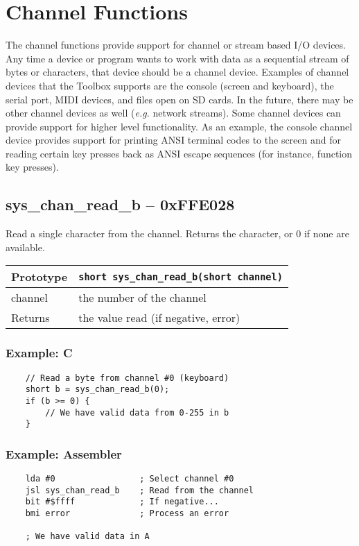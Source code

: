 \section{Channel Functions}
The channel functions provide support for channel or stream based I/O devices.
Any time a device or program wants to work with data as a sequential stream of bytes or characters,
that device should be a channel device.
Examples of channel devices that the Toolbox supports are the console (screen and keyboard), the serial port,
MIDI devices, and files open on SD cards.
In the future, there may be other channel devices as well ({\it e.g.} network streams).
Some channel devices can provide support for higher level functionality.
As an example, the console channel device provides support for printing ANSI terminal codes to the screen
and for reading certain key presses back as ANSI escape sequences (for instance, function key presses).

\subsection*{sys\_chan\_read\_b -- 0xFFE028}
Read a single character from the channel. Returns the character, or 0 if none are available.

\bigskip

\begin{tabular}{|l||l|} \hline
Prototype & \lstinline!short sys_chan_read_b(short channel)! \\ \hline
channel & the number of the channel \\ \hline
Returns & the value read (if negative, error) \\ \hline
\end{tabular}

\subsubsection*{Example: C}
\begin{lstlisting}
    // Read a byte from channel #0 (keyboard)
    short b = sys_chan_read_b(0);
    if (b >= 0) {
        // We have valid data from 0-255 in b
    }
\end{lstlisting}

\subsubsection*{Example: Assembler}
\begin{verbatim}
    lda #0                 ; Select channel #0
    jsl sys_chan_read_b    ; Read from the channel
    bit #$ffff             ; If negative...
    bmi error              ; Process an error

    ; We have valid data in A
\end{verbatim}

